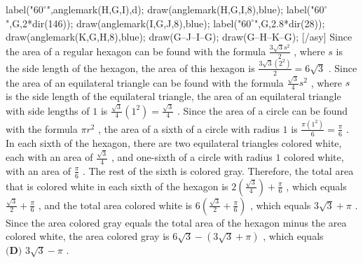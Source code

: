 \documentclass[12pt]{article}
\begin{document}
label("$60^\circ$",anglemark(H,G,I),d); draw(anglemark(H,G,I,8),blue); label("$60^\circ$",G,2*dir(146)); draw(anglemark(I,G,J,8),blue); label("$60^\circ$",G,2.8*dir(28)); draw(anglemark(K,G,H,8),blue); draw(G--J--I--G); draw(G--H--K--G); [/asy] Since the area of a regular hexagon can be found with the formula $\frac{3\sqrt{3}s^2}{2}$ , where $s$ is the side length of the hexagon, the area of this hexagon is $\frac{3\sqrt{3}(2^2)}{2} = 6\sqrt{3}$ . Since the area of an equilateral triangle can be found with the formula $\frac{\sqrt{3}}{4}s^2$ , where $s$ is the side length of the equilateral triangle, the area of an equilateral triangle with side lengths of $1$ is $\frac{\sqrt{3}}{4}\left(1^2\right) = \frac{\sqrt{3}}{4}$ . Since the area of a circle can be found with the formula $\pi r^2$ , the area of a sixth of a circle with radius $1$ is $\frac{\pi(1^2)}{6} = \frac{\pi}{6}$ . In each sixth of the hexagon, there are two equilateral triangles colored white, each with an area of $\frac{\sqrt{3}}{4}$ , and one-sixth of a circle with radius $1$ colored white, with an area of $\frac{\pi}{6}$ . The rest of the sixth is colored gray. Therefore, the total area that is colored white in each sixth of the hexagon is $2\left(\frac{\sqrt{3}}{4}\right) + \frac{\pi}{6}$ , which equals $\frac{\sqrt{3}}{2} + \frac{\pi}{6}$ , and the total area colored white is $6\left(\frac{\sqrt{3}}{2} + \frac{\pi}{6}\right)$ , which equals $3\sqrt{3} + \pi$ . Since the area colored gray equals the total area of the hexagon minus the area colored white, the area colored gray is $6\sqrt{3} - (3\sqrt{3} + \pi)$ , which equals $\boxed{\textbf{(D) }3\sqrt{3} - \pi}$ .
\end{document}
